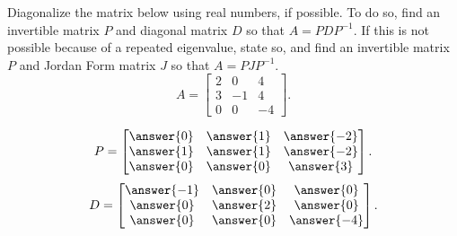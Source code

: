 \documentclass{ximera}
\begin{document}
\begin{exercise}
    Diagonalize the matrix below using real numbers, if possible. To do so, find an invertible matrix $P$ and diagonal matrix $D$ so that $A = PDP^{-1}$. If this is not possible because of a repeated eigenvalue, state so, and find an invertible matrix $P$ and Jordan Form matrix $J$ so that $A = PJP^{-1}$. 
    \[ 
        A = 
        \begin{bmatrix} 
            2 &  0 &  4 \\ 
            3  &-1 & 4 \\ 
            0  & 0 &-4 
        \end{bmatrix}.
    \]
    \begin{multipleChoice}
    \end{multipleChoice}
    \begin{problem}
        \[ 
            P = 
            \begin{bmatrix} 
                \answer{0} & \answer{1} & \answer{-2} \\  
                \answer{1} & \answer{1} & \answer{-2} \\
                \answer{0} & \answer{0} & \answer{3}
            \end{bmatrix}.
        \]
        \[ 
            D = 
            \begin{bmatrix} 
                \answer{-1} & \answer{0} & \answer{0} \\  
                \answer{0} & \answer{2} & \answer{0} \\
                \answer{0} & \answer{0} & \answer{-4}
            \end{bmatrix}.
        \]
    \end{problem}
\end{exercise} 
\end{document}
